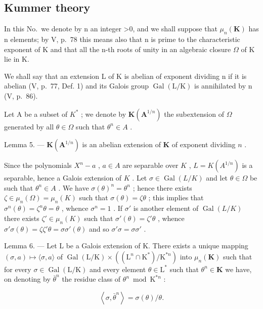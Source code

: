 \subsection{Kummer theory}

In this No.~we denote by n an integer \textgreater0, and we shall suppose that \(\mu_{n}(\mathbf{K})\) has n elements; by V, p.~78 this means also that n is prime to the characteristic exponent of K and that all the n-th roots of unity in an algebraic closure \(\Omega\) of K lie in K.

We shall say that an extension L of K is abelian of exponent dividing n if it is abelian (V, p.~77, Def. 1) and its Galois group \(\operatorname{Gal}(\mathrm{L}/\mathrm{K})\) is annihilated by n (V, p.~86).

Let A be a subset of \(K^{*}\) ; we denote by \(\mathbf{K}(\mathbf{A}^{1/n})\) the subextension of \(\Omega\) generated by all \(\theta \in \Omega\) such that \(\theta^{n} \in A\) .

Lemma 5. --- \(\mathbf{K}(\mathbf{A}^{1 / n})\) is an abelian extension of \(\mathbf{K}\) of exponent dividing \(n\) .

Since the polynomials \(X^n - a\) , \(a \in A\) are separable over \(K\) , \(L = K(A^{1/n})\) is a separable, hence a Galois extension of \(K\) . Let \(\sigma \in \operatorname{Gal}(L/K)\) and let \(\theta \in \Omega\) be such that \(\theta^n \in A\) . We have \(\sigma(\theta)^n = \theta^n\) ; hence there exists \(\zeta \in \mu_n(\Omega) = \mu_n(K)\) such that \(\sigma(\theta) = \zeta\theta\) ; this implies that \(\sigma^n(\theta) = \zeta^n\theta = \theta\) , whence \(\sigma^n = 1\) . If \(\sigma'\) is another element of \(\operatorname{Gal}(L/K)\) there exists \(\zeta' \in \mu_n(K)\) such that \(\sigma'(\theta) = \zeta'\theta\) , whence \(\sigma' \sigma(\theta) = \zeta\zeta'\theta = \sigma\sigma'(\theta)\) and so \(\sigma' \sigma = \sigma\sigma'\) .

Lemma 6. --- Let L be a Galois extension of K. There exists a unique mapping \((\sigma, a) \mapsto \langle \sigma, a \rangle\) of \(\operatorname{Gal}(\mathrm{L} / \mathrm{K}) \times ((\mathrm{L}^n \cap \mathrm{K}^*) / \mathrm{K}^{*n})\) into \(\mu_n(\mathbf{K})\) such that for every \(\sigma \in \operatorname{Gal}(\mathrm{L} / \mathrm{K})\) and every element \(\theta \in \mathrm{L}^*\) such that \(\theta^n \in \mathbf{K}\) we have, on denoting by \(\bar{\theta}^n\) the residue class of \(\theta^n \bmod \mathrm{K}^{*n}\) :

\[
\left\langle \sigma , \bar {\theta} ^ {n} \right\rangle = \sigma (\theta) / \theta .\tag{13}
\]

